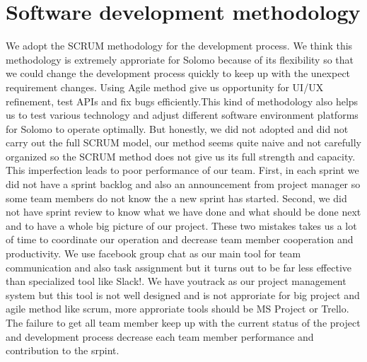 \section{Software development methodology}
We adopt the SCRUM methodology for the development process. We think this methodology is extremely approriate for Solomo because of its flexibility so that we could change the development process quickly to keep up with the unexpect requirement changes. Using Agile method give us opportunity for UI/UX refinement, test APIs and fix bugs efficiently.This kind of methodology also helps us to test various technology and adjust different software environment platforms for Solomo to operate optimally. But honestly, we did not adopted and did not carry out the full SCRUM model, our method seems quite naive and not carefully organized so the SCRUM method does not give us its full strength and capacity. This imperfection leads to poor performance of our team. First, in each sprint we did not have a sprint backlog and also an announcement from project manager so some team members do not know the a new sprint has started. Second, we did not have sprint review to know what we have done and what should be done next and to have a whole big picture of our project. These two mistakes takes us a lot of time to coordinate our operation and decrease team member cooperation and productivity. We use facebook group chat as our main tool for team communication and also task assignment but it turns out to be far less effective than specialized tool like Slack!. We have youtrack as our project management system but this tool is not well designed and is not approriate for big project and agile method like scrum, more approriate tools should be MS Project or Trello. The failure to get all team member keep up with the current status of the project and development process decrease each team member performance and contribution to the srpint.